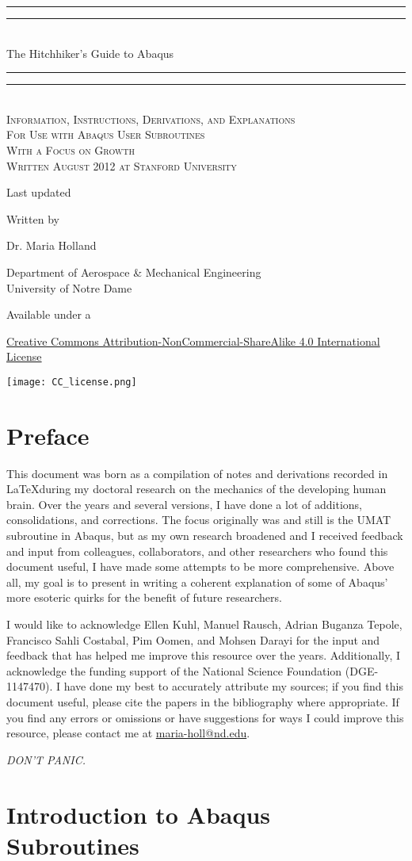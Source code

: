 \documentclass[10pt,letterpaper,oneside]{report}
\newcommand*{\titleGP}{\begingroup 
\thispagestyle{empty}
\centering

\vspace*{8\baselineskip} %
\rule{\textwidth}{1.6pt}\vspace*{-\baselineskip}\vspace*{2pt} 
\rule{\textwidth}{0.4pt}\\[\baselineskip] 
{\LARGE The Hitchhiker's Guide to Abaqus}\\[0.2\baselineskip] 
\rule{\textwidth}{0.4pt}\vspace*{-\baselineskip}\vspace{3.2pt} 
\rule{\textwidth}{1.6pt}\\[\baselineskip] %

\scshape
Information, Instructions, Derivations, and Explanations \\ 
For Use with Abaqus User Subroutines \\ 
With a Focus on Growth \\ [\baselineskip]
Written August 2012 at Stanford University \par  
Last updated \monthname \, \the\year

\vspace*{2\baselineskip} %

Written by \\[\baselineskip]
{\Large Dr. Maria Holland\par}
Department of Aerospace \& Mechanical Engineering \\ 
University of Notre Dame\par
\vspace*{2\baselineskip}
Available under a\par
\href{http://creativecommons.org/licenses/by-nc-sa/4.0/}{
Creative Commons Attribution-NonCommercial-ShareAlike 4.0 International License}

\texttt{[image: CC\_license.png]}

\vfill

\endgroup}
\begin{document}
\titleGP 


\chapter*{Preface}
\thispagestyle{empty}

This document was born as a compilation of notes and derivations recorded in \LaTeX during my doctoral research on the mechanics of the developing human brain.  Over the years and several versions, I have done a lot of additions, consolidations, and corrections.  The focus originally was and still is the UMAT subroutine in Abaqus, but as my own research broadened and I received feedback and input from colleagues, collaborators, and other researchers who found this document useful, I have made some attempts to be more comprehensive.  Above all, my goal is to present in writing a coherent explanation of some of Abaqus' more esoteric quirks for the benefit of future researchers.

I would like to acknowledge Ellen Kuhl, Manuel Rausch, Adrian Buganza Tepole, Francisco Sahli Costabal, Pim Oomen, and Mohsen Darayi for the input and feedback that has helped me improve this resource over the years.  
Additionally, I acknowledge the funding support of the National Science Foundation (DGE-1147470).  
I have done my best to accurately attribute my sources; if you find this document useful, please cite the papers in the bibliography where appropriate.  If you find any errors or omissions or have suggestions for ways I could improve this resource, please contact me at \href{mailto:maria-holl@nd.edu}{maria-holl{\selectfont @}nd.edu}.

\vspace{0.5in}
\begin{center} 
\large{\emph{DON'T PANIC.}}
\end{center}


\newpage
\setcounter{tocdepth}{1}
\tableofcontents

\restoregeometry


\chapter{Introduction to Abaqus Subroutines}
\end{document}
